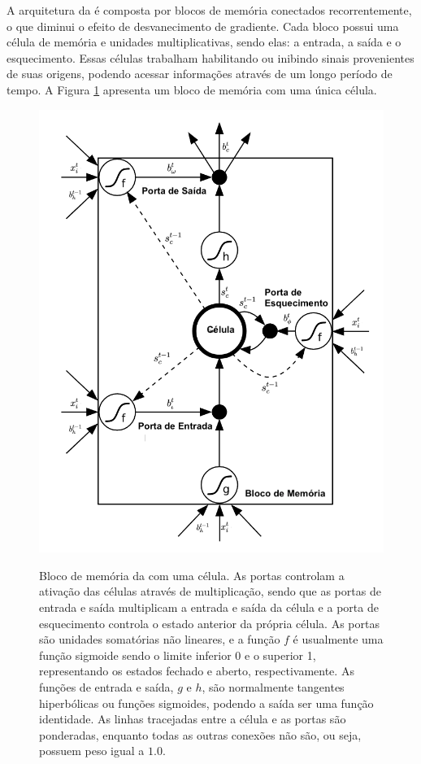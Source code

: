 A arquitetura da  é composta por blocos de memória conectados recorrentemente, o que diminui o efeito de desvanecimento de gradiente. Cada bloco possui uma célula de memória e unidades multiplicativas, sendo elas: a entrada, a saída e o esquecimento. Essas células trabalham habilitando ou inibindo sinais provenientes de suas origens, podendo acessar informações através de um longo período de tempo. A Figura \ref{fig:rnn-lstm-memoria} apresenta um bloco de memória com uma única célula.
\begin{figure}[htbp]
    \centering
        \caption[Bloco de memória da  com uma célula.]{Bloco de memória da  com uma célula. As portas controlam a ativação das células através de multiplicação, sendo que as portas de entrada e saída multiplicam a entrada e saída da célula e a porta de esquecimento controla o estado anterior da própria célula. As portas são unidades somatórias não lineares, e a função $f$ é usualmente uma função sigmoide sendo o limite inferior 0 e o superior 1, representando os estados fechado e aberto, respectivamente. As funções de entrada e saída, $g$ e $h$, são normalmente tangentes hiperbólicas ou funções sigmoides, podendo a saída ser uma função identidade. As linhas tracejadas entre a célula e as portas são ponderadas, enquanto todas as outras conexões não são, ou seja, possuem peso igual a $1.0$.}
        \includegraphics[scale=0.8]{resources/images/pln/rnn-lstm-memoria.png}
        \label{fig:rnn-lstm-memoria}
\end{figure}

